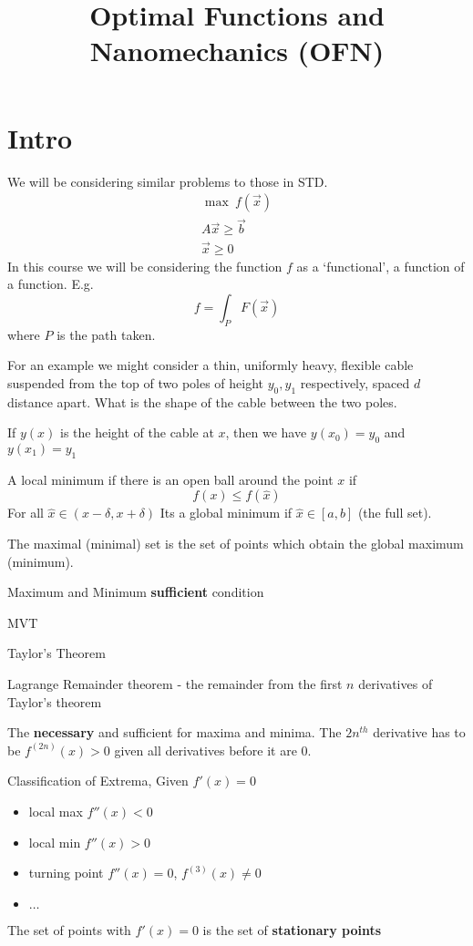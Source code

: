 \documentclass{X:/Documents/Coding/Latex/myassignment}
\title{Optimal Functions and Nanomechanics (OFN)}
\begin{document}
\maketitle

\section{Intro}
We will be considering similar problems to those in STD. 
\begin{align*}
	\max \ f(\vec x)\\
	A \vec x \geq \vec b\\
	\vec x \geq 0
\end{align*}
In this course we will be considering the function $f$ as a `functional', a function of a function.
E.g.
\[f = \int_P F(\vec x)\]
where $P$ is the path taken.


For an example we might
consider a thin, uniformly heavy, flexible cable suspended from the top of two poles of height $y_0,y_1$ respectively, spaced $d$ distance apart. What is the shape of the cable between the two poles.

If $y(x)$ is the height of the cable at $x$, then we have $y(x_0) = y_0$ and $y(x_1) = y_1$



A local minimum if there is an open ball around the point $x$ if 
\[f(x) \leq f(\hat{x})\]
For all $\hat{x} \in (x- \delta, x + \delta)$
Its a global minimum if $\hat{x} \in [a,b]$ (the full set).


The maximal (minimal) set is the set of points which obtain the global maximum (minimum).

Maximum and Minimum \textbf{sufficient} condition

MVT

Taylor's Theorem

Lagrange Remainder theorem - the remainder from the first $n$ derivatives of Taylor's theorem 

The \textbf{necessary} and sufficient for maxima and minima.
The $2n^{th}$ derivative has to be $f^{(2n)}(x)>0$ given all derivatives before it are $0$.

Classification of Extrema, Given $f'(x) = 0$
\begin{itemize}
	\item local max $f''(x)<0$
	\item local min $f''(x)>0$
	\item turning point $f''(x)=0$, $f^{(3)}(x) \neq 0$
	\item $\ldots$
\end{itemize}
The set of points with $f'(x) =0$ is the set of \textbf{stationary points}
\end{document}
